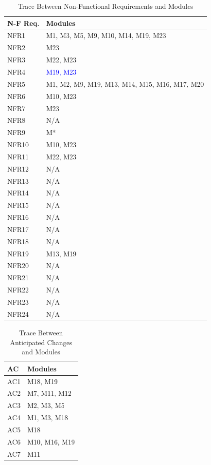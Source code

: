 \documentclass[12pt, titlepage]{article}
\begin{document}
\begin{table}[H]
\centering
\begin{tabular}{p{} p{}}
\toprule
\textbf{N-F Req.} & \textbf{Modules}\\
\midrule
NFR1 & M1, M3, M5, M9, M10, M14, M19, M23\\
NFR2 & M23\\
NFR3 & M22, M23\\
NFR4 & \textcolor{blue}{M19, M23}\\
NFR5 & M1, M2, M9, M19, M13, M14, M15, M16, M17, M20\\
NFR6 & M10, M23\\
NFR7 & M23\\
NFR8 & N/A\\
NFR9 & M*\\
NFR10 & M10, M23\\
NFR11 & M22, M23\\
NFR12 & N/A\\
NFR13 & N/A\\
NFR14 & N/A\\
NFR15 & N/A\\
NFR16 & N/A\\
NFR17 & N/A\\
NFR18 & N/A\\
NFR19 & M13, M19\\
NFR20 & N/A\\
NFR21 & N/A\\
NFR22 & N/A\\
NFR23 & N/A\\
NFR24 & N/A\\
\bottomrule
\end{tabular}
\caption{Trace Between Non-Functional Requirements and Modules}
\label{TblRT}
\end{table}

\begin{table}[H]
\centering
\begin{tabular}{p{} p{}}
\toprule
\textbf{AC} & \textbf{Modules}\\
\midrule
AC1 & M18, M19 \\
AC2 & M7, M11, M12 \\
AC3 & M2, M3, M5 \\
AC4 & M1, M3, M18 \\
AC5 & M18 \\
AC6 & M10, M16, M19 \\
AC7 & M11 \\
\bottomrule
\end{tabular}
\caption{Trace Between Anticipated Changes and Modules}
\label{TblACT}
\end{table}
\end{document}
